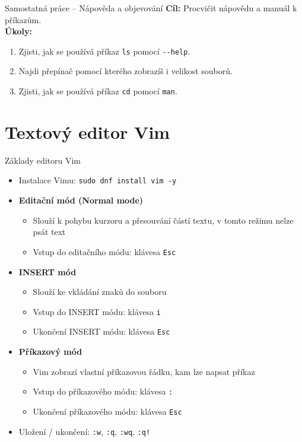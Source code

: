 \documentclass{beamer}
\begin{document}
\begin{frame}{Samostatná práce – Nápověda a objevování}
\small
\textbf{Cíl:} Procvičit nápovědu a manuál k příkazům.\\[0.5em]

\textbf{Úkoly:}
\begin{enumerate}
  \item Zjisti, jak se používá příkaz \texttt{ls} pomocí \texttt{-{}-help}.
  \item Najdi přepínač pomocí kterého zobrazíš i velikost souborů.
  \item Zjisti, jak se používá příkaz \texttt{cd} pomocí \texttt{man}.

\end{enumerate}
\end{frame}


\section{Textový editor Vim}
\begin{frame}{Základy editoru Vim}
  \begin{itemize}
    \item Instalace Vimu: \texttt{sudo dnf install vim -y}

    \item \textbf{Editační mód (Normal mode)}
      \begin{itemize}
        \item Slouží k pohybu kurzoru a přesouvání částí textu, v tomto režimu
        nelze psát text
        \item Vstup do editačního módu: klávesa \texttt{Esc}
      \end{itemize}
            \vspace{0.5em}
    \item \textbf{INSERT mód}
      \begin{itemize}
        \item Slouží ke vkládání znaků do souboru
        \item Vstup do INSERT módu: klávesa \texttt{i}
        \item Ukončení INSERT módu: klávesa \texttt{Esc}
      \end{itemize}
            \vspace{0.5em}
    \item \textbf{Příkazový mód}
      \begin{itemize}
        \item Vim zobrazí vlastní příkazovou řádku, kam lze napsat příkaz
        \item Vstup do příkazového módu: klávesa \texttt{:}
        \item Ukončení příkazového módu: klávesa \texttt{Esc}
      \end{itemize}
            \vspace{0.5em}
    \item Uložení / ukončení: \texttt{:w}, \texttt{:q}, \texttt{:wq}, \texttt{:q!}
  \end{itemize}
\end{frame}
\end{document}
